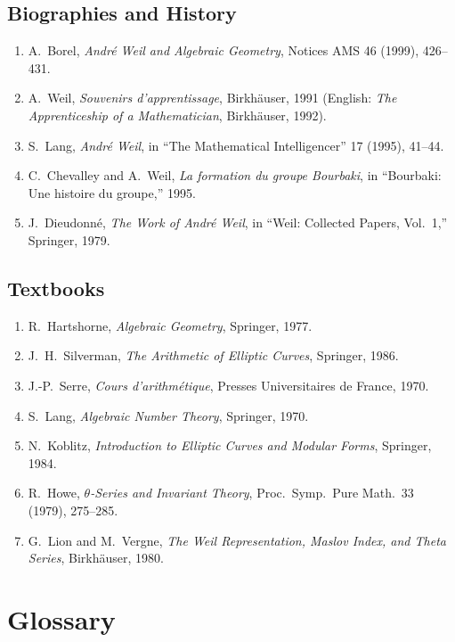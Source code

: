 \subsection*{Biographies and History}
\begin{enumerate}
    \item A.\ Borel, \textit{Andr\'{e} Weil and Algebraic Geometry}, Notices AMS 46 (1999), 426--431.
    \item A.\ Weil, \textit{Souvenirs d'apprentissage}, Birkh\"{a}user, 1991 (English: \textit{The Apprenticeship of a Mathematician}, Birkh\"{a}user, 1992).
    \item S.\ Lang, \textit{Andr\'{e} Weil}, in ``The Mathematical Intelligencer'' 17 (1995), 41--44.
    \item C.\ Chevalley and A.\ Weil, \textit{La formation du groupe Bourbaki}, in ``Bourbaki: Une histoire du groupe,'' 1995.
    \item J.\ Dieudonn\'{e}, \textit{The Work of Andr\'{e} Weil}, in ``Weil: Collected Papers, Vol.\ 1,'' Springer, 1979.
\end{enumerate}

\subsection*{Textbooks}
\begin{enumerate}
    \item R.\ Hartshorne, \textit{Algebraic Geometry}, Springer, 1977.
    \item J.\ H.\ Silverman, \textit{The Arithmetic of Elliptic Curves}, Springer, 1986.
    \item J.-P.\ Serre, \textit{Cours d'arithm\'{e}tique}, Presses Universitaires de France, 1970.
    \item S.\ Lang, \textit{Algebraic Number Theory}, Springer, 1970.
    \item N.\ Koblitz, \textit{Introduction to Elliptic Curves and Modular Forms}, Springer, 1984.
    \item R.\ Howe, \textit{$\theta$-Series and Invariant Theory}, Proc.\ Symp.\ Pure Math.\ 33 (1979), 275--285.
    \item G.\ Lion and M.\ Vergne, \textit{The Weil Representation, Maslov Index, and Theta Series}, Birkh\"{a}user, 1980.
\end{enumerate}

\section*{Glossary}

